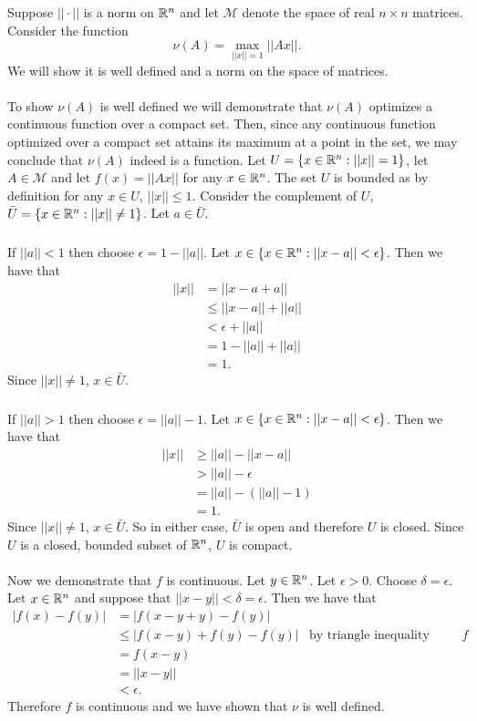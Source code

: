 \documentclass[letterpaper,12pt,oneside,onecolumn]{article}
\newcommand{\cM}{\mathcal{M}} \newcommand{\cN}{\mathcal{N}}
\begin{document}
\section{}
\paragraph{}
Suppose $||\cdot||$ is a norm on $\mathbb{R}^n$ and let $\cM$ denote the space of real $n \times n$ matrices. Consider the function $$\nu(A) = \max_{||x||=1} ||Ax||.$$
We will show it is well defined and a norm on the space of matrices.
\paragraph{}
To show $\nu(A)$ is well defined we will demonstrate that $\nu(A)$ optimizes a continuous function over a compact set. Then, since any continuous function optimized over a compact set attains its maximum at a point in the set, we may conclude that $\nu(A)$ indeed is a function. Let $U = \{x \in \mathbb{R}^n: ||x|| = 1\}$, let $A\in \cM$ and let $f(x) = ||Ax||$ for any $x \in \mathbb{R}^n$. The set $U$ is bounded as by definition for any $x \in U$, $||x|| \leq 1$. Consider the complement of $U$, $\bar{U} = \{x \in \mathbb{R}^n: ||x|| \neq 1\}$. Let $a \in \bar{U}$.
\subparagraph{}
If $||a|| < 1$ then choose $\epsilon = 1 - ||a||$. Let $x \in \{x \in \mathbb{R}^n: ||x-a|| < \epsilon\}$. Then we have that
\begin{align*}
||x|| &= ||x-a + a|| \\
&\leq ||x-a|| + ||a|| \\
&< \epsilon + ||a|| \\
&= 1 - ||a|| + ||a|| \\
&= 1.
\end{align*} 
Since $||x|| \neq 1$, $x\in \bar{U}$.
\subparagraph{}
If $||a|| > 1$ then choose $\epsilon = ||a|| - 1$. Let $x \in \{x \in \mathbb{R}^n: ||x-a|| < \epsilon\}$. Then we have that
\begin{align*}
||x|| &\geq ||a|| - ||x-a|| \\
&> ||a|| - \epsilon \\
&= ||a|| -(||a|| - 1) \\
&= 1.
\end{align*}
Since $||x|| \neq 1$, $x \in \bar{U}$. So in either case, $\bar{U}$ is open and therefore $U$ is closed. 
Since $U$ is a closed, bounded subset of $\mathbb{R}^n$, $U$ is compact.
\paragraph{}
Now we demonstrate that $f$ is continuous. Let $y \in \mathbb{R}^n$. Let $\epsilon > 0 $. Choose $\delta = \epsilon$. Let $x \in \mathbb{R}^n$ and suppose that $||x - y|| < \delta = \epsilon$. Then we have that
\begin{align*}
|f(x) - f(y)| &= |f(x - y + y) - f(y)| \\
&\leq |f(x-y) + f(y) -f(y)| &\text{by triangle inequality applied to $f$}\\
&= f(x-y) \\
&= ||x-y|| \\
&< \epsilon.
\end{align*}
Therefore $f$ is continuous and we have shown that $\nu$ is well defined.
\end{document}
